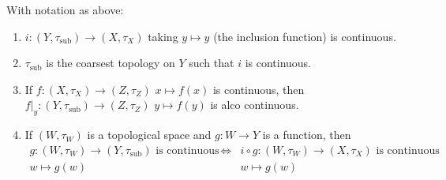 \documentclass[12pt, twosided]{article}
\begin{document}
\begin{prop}
  With notation as above:
  \begin{enumerate}
  \item \(i: (Y, \tau_{\mathrm{sub}}) \to (X, \tau_X)\) taking \(y \mapsto y\) (the inclusion function) is continuous.
  \item \(\tau_{\mathrm{sub}}\) is the coarsest topology on \(Y\) such that \(i\) is continuous.
  \item If \(f: (X, \tau_X) \to (Z, \tau_Z)\) \(x \mapsto f(x)\) is continuous, then \(f\vert_y : (Y, \tau_\mathrm{sub}) \to (Z, \tau_Z)\) \(y \mapsto f(y)\) is alco continuous.
  \item If \((W, \tau_W)\) is a topological space and \(g: W \to Y\) is a function, then
    \begin{align*}
      g:(W, \tau_W) \to (Y, \tau_{\mathrm{sub}}) \text{ is continuous } &\Leftrightarrow& i \circ g : (W , \tau_W) \to (X, \tau_X) \text{ is continuous} \\
      w \mapsto g(w) & & w \mapsto g(w)
    \end{align*}
  \end{enumerate}
\end{prop}
\end{document}
